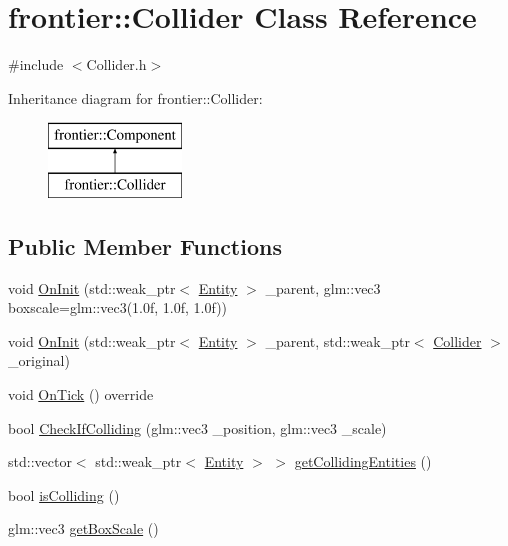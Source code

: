 \hypertarget{classfrontier_1_1_collider}{}\section{frontier\+:\+:Collider Class Reference}
\label{classfrontier_1_1_collider}


{\ttfamily \#include $<$Collider.\+h$>$}

Inheritance diagram for frontier\+:\+:Collider\+:\begin{figure}[H]
\begin{center}
\leavevmode
\includegraphics[height=2.000000cm]{classfrontier_1_1_collider}
\end{center}
\end{figure}
\subsection*{Public Member Functions}
\begin{DoxyCompactItemize}
\item 
void \hyperlink{classfrontier_1_1_collider_a111e91b9ed9a336e0a231daeaa6f3490}{On\+Init} (std\+::weak\+\_\+ptr$<$ \hyperlink{classfrontier_1_1_entity}{Entity} $>$ \+\_\+parent, glm\+::vec3 boxscale=glm\+::vec3(1.\+0f, 1.\+0f, 1.\+0f))
\item 
void \hyperlink{classfrontier_1_1_collider_a06dfeb56017f45597f1812fc5cf8236d}{On\+Init} (std\+::weak\+\_\+ptr$<$ \hyperlink{classfrontier_1_1_entity}{Entity} $>$ \+\_\+parent, std\+::weak\+\_\+ptr$<$ \hyperlink{classfrontier_1_1_collider}{Collider} $>$ \+\_\+original)
\item 
void \hyperlink{classfrontier_1_1_collider_ac03782c94e8f7a2064ea1441cbd12c81}{On\+Tick} () override
\item 
bool \hyperlink{classfrontier_1_1_collider_aa0269702eb2d87a12087e933821ad6e0}{Check\+If\+Colliding} (glm\+::vec3 \+\_\+position, glm\+::vec3 \+\_\+scale)
\item 
std\+::vector$<$ std\+::weak\+\_\+ptr$<$ \hyperlink{classfrontier_1_1_entity}{Entity} $>$ $>$ \hyperlink{classfrontier_1_1_collider_aad1c0f7d7a9353caded05cf383e3b3c9}{get\+Colliding\+Entities} ()
\item 
bool \hyperlink{classfrontier_1_1_collider_ad0ad92d0d5a2060284548a990e6aef58}{is\+Colliding} ()
\item 
glm\+::vec3 \hyperlink{classfrontier_1_1_collider_a1bec632fd9941d7ebea79e349bc53059}{get\+Box\+Scale} ()
\end{DoxyCompactItemize}
